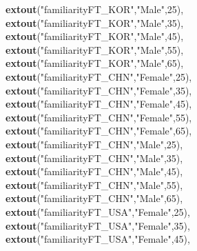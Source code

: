 \documentclass[
]{article}
\newenvironment{Shaded}{\begin{snugshade}}{\end{snugshade}}
\newcommand{\DecValTok}[1]{\textcolor[rgb]{0.00,0.00,0.81}{#1}}
\newcommand{\KeywordTok}[1]{\textcolor[rgb]{0.13,0.29,0.53}{\textbf{#1}}}
\newcommand{\NormalTok}[1]{#1}
\newcommand{\StringTok}[1]{\textcolor[rgb]{0.31,0.60,0.02}{#1}}
\begin{document}
\begin{Shaded}
\begin{Highlighting}[]
               \KeywordTok{extout}\NormalTok{(}\StringTok{"familiarityFT_KOR"}\NormalTok{,}\StringTok{"Male"}\NormalTok{,}\DecValTok{25}\NormalTok{),}
               \KeywordTok{extout}\NormalTok{(}\StringTok{"familiarityFT_KOR"}\NormalTok{,}\StringTok{"Male"}\NormalTok{,}\DecValTok{35}\NormalTok{),}
               \KeywordTok{extout}\NormalTok{(}\StringTok{"familiarityFT_KOR"}\NormalTok{,}\StringTok{"Male"}\NormalTok{,}\DecValTok{45}\NormalTok{),}
               \KeywordTok{extout}\NormalTok{(}\StringTok{"familiarityFT_KOR"}\NormalTok{,}\StringTok{"Male"}\NormalTok{,}\DecValTok{55}\NormalTok{),}
               \KeywordTok{extout}\NormalTok{(}\StringTok{"familiarityFT_KOR"}\NormalTok{,}\StringTok{"Male"}\NormalTok{,}\DecValTok{65}\NormalTok{),}
               \KeywordTok{extout}\NormalTok{(}\StringTok{"familiarityFT_CHN"}\NormalTok{,}\StringTok{"Female"}\NormalTok{,}\DecValTok{25}\NormalTok{),}
               \KeywordTok{extout}\NormalTok{(}\StringTok{"familiarityFT_CHN"}\NormalTok{,}\StringTok{"Female"}\NormalTok{,}\DecValTok{35}\NormalTok{),}
               \KeywordTok{extout}\NormalTok{(}\StringTok{"familiarityFT_CHN"}\NormalTok{,}\StringTok{"Female"}\NormalTok{,}\DecValTok{45}\NormalTok{),}
               \KeywordTok{extout}\NormalTok{(}\StringTok{"familiarityFT_CHN"}\NormalTok{,}\StringTok{"Female"}\NormalTok{,}\DecValTok{55}\NormalTok{),}
               \KeywordTok{extout}\NormalTok{(}\StringTok{"familiarityFT_CHN"}\NormalTok{,}\StringTok{"Female"}\NormalTok{,}\DecValTok{65}\NormalTok{),}
               \KeywordTok{extout}\NormalTok{(}\StringTok{"familiarityFT_CHN"}\NormalTok{,}\StringTok{"Male"}\NormalTok{,}\DecValTok{25}\NormalTok{),}
               \KeywordTok{extout}\NormalTok{(}\StringTok{"familiarityFT_CHN"}\NormalTok{,}\StringTok{"Male"}\NormalTok{,}\DecValTok{35}\NormalTok{),}
               \KeywordTok{extout}\NormalTok{(}\StringTok{"familiarityFT_CHN"}\NormalTok{,}\StringTok{"Male"}\NormalTok{,}\DecValTok{45}\NormalTok{),}
               \KeywordTok{extout}\NormalTok{(}\StringTok{"familiarityFT_CHN"}\NormalTok{,}\StringTok{"Male"}\NormalTok{,}\DecValTok{55}\NormalTok{),}
               \KeywordTok{extout}\NormalTok{(}\StringTok{"familiarityFT_CHN"}\NormalTok{,}\StringTok{"Male"}\NormalTok{,}\DecValTok{65}\NormalTok{),}
               \KeywordTok{extout}\NormalTok{(}\StringTok{"familiarityFT_USA"}\NormalTok{,}\StringTok{"Female"}\NormalTok{,}\DecValTok{25}\NormalTok{),}
               \KeywordTok{extout}\NormalTok{(}\StringTok{"familiarityFT_USA"}\NormalTok{,}\StringTok{"Female"}\NormalTok{,}\DecValTok{35}\NormalTok{),}
               \KeywordTok{extout}\NormalTok{(}\StringTok{"familiarityFT_USA"}\NormalTok{,}\StringTok{"Female"}\NormalTok{,}\DecValTok{45}\NormalTok{),}

\end{Highlighting}
\end{Shaded}
\end{document}
